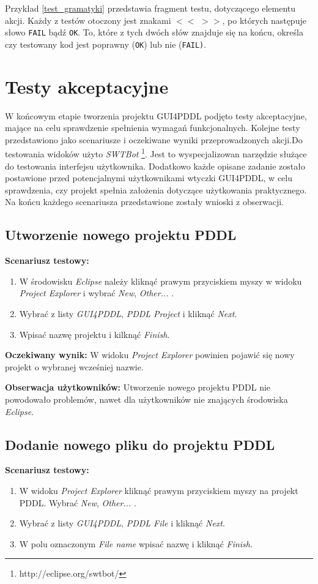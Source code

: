 Przykład \ref{test_gramatyki} przedstawia fragment testu, dotyczącego elementu akcji. Każdy z testów otoczony jest znakami \texttt{$<<$} \texttt{$>>$}, po których następuje słowo \texttt{FAIL} bądź \texttt{OK}. To, które z tych dwóch słów znajduje się na końcu, określa czy testowany kod jest poprawny (\texttt{OK}) lub nie (\texttt{FAIL)}.




\section{Testy akceptacyjne}
W końcowym etapie tworzenia projektu GUI4PDDL podjęto testy akceptacyjne, mające na celu sprawdzenie spełnienia wymagań funkcjonalnych. Kolejne testy przedstawiono jako scenariusze i oczekiwane wyniki przeprowadzonych akcji.Do testowania widoków użyto \emph{SWTBot} \footnote{http://eclipse.org/swtbot/}. Jest to wyspecjalizowan narzędzie służące do testowania interfejsu użytkownika. Dodatkowo każde opisane zadanie zostało postawione przed potencjalnymi użytkownikami wtyczki GUI4PDDL, w celu sprawdzenia, czy projekt spełnia założenia dotyczące użytkowania praktycznego. Na końcu każdego scenariusza przedstawione zostały wnioski z obserwacji. 
\subsection{Utworzenie nowego projektu PDDL}
\textbf{Scenariusz testowy:}
  \begin{enumerate}
  
\item W środowisku \textit{Eclipse} należy kliknąć prawym przyciskiem myszy w widoku \textit{Project Explorer} i wybrać \textit{New}, \textit{Other...} .
\item Wybrać z listy \textit{GUI4PDDL}, \textit{PDDL Project} i kliknąć \textit{Next}.
\item Wpisać nazwę projektu i kilknąć \textit{Finish}.
\end{enumerate}

\textbf{Oczekiwany wynik:} W widoku \textit{Project Explorer} powinien pojawić się nowy projekt o wybranej wcześniej nazwie.

\textbf{Obserwacja użytkowników:} Utworzenie nowego projektu PDDL nie powodowało problemów, nawet dla użytkowników nie znających środowiska \textit{Eclipse}.
\subsection{Dodanie nowego pliku do projektu PDDL}
\textbf{Scenariusz testowy:}
  \begin{enumerate}
  
\item W widoku \textit{Project Explorer} kliknąć prawym przyciskiem myszy na projekt PDDL. Wybrać \textit{New}, \textit{Other...} .
\item Wybrać z listy \textit{GUI4PDDL}, \textit{PDDL File} i kliknąć \textit{Next}.
\item W polu oznaczonym \textit{File name} wpisać nazwę i kliknąć \textit{Finish}.
\end{enumerate}

